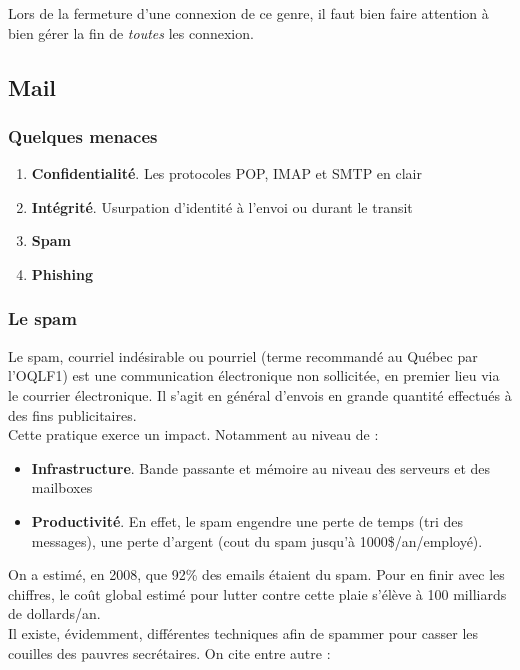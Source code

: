 \documentclass{report}
\begin{document}
Lors de la fermeture d'une connexion de ce genre, il faut bien faire attention à bien gérer la fin de \textit{toutes} les connexion.

\subsection{Mail}

\subsubsection{Quelques menaces}

\begin{enumerate}
    \item \textbf{Confidentialité}. Les protocoles POP, IMAP et SMTP en clair
    \item \textbf{Intégrité}. Usurpation d'identité à l'envoi ou durant le transit
    \item \textbf{Spam}
    \item \textbf{Phishing}
\end{enumerate}

\subsubsection{Le spam}

Le spam, courriel indésirable ou pourriel (terme recommandé
au Québec par l'OQLF1) est une communication électronique non sollicitée, en premier lieu via le courrier électronique. Il s'agit en général d'envois en grande quantité effectués à des fins publicitaires.\\

Cette pratique exerce un impact. Notamment au niveau de :

\begin{itemize}
    \item \textbf{Infrastructure}. Bande passante et mémoire au niveau des serveurs et des mailboxes
    \item \textbf{Productivité}. En effet, le spam engendre une perte de temps (tri des messages), une perte d'argent (cout du spam jusqu'à 1000\$/an/employé).
\end{itemize}

On a estimé, en 2008, que 92\% des emails étaient du spam. Pour en finir avec les chiffres, le coût global estimé pour lutter contre cette plaie s'élève à 100 milliards de dollards/an.\\

Il existe, évidemment, différentes techniques afin de spammer pour casser les couilles des pauvres secrétaires. On cite entre autre :
\end{document}
